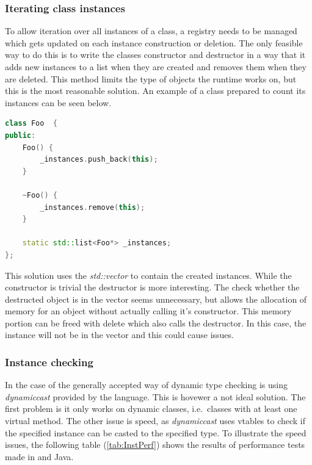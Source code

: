 \subsubsection{Iterating class instances}\label{sect:IteratingClassInstances}

To allow iteration over all instances of a class, a registry needs to be managed
which gets updated on each instance construction or deletion. The only feasible
way to do this is to write the classes constructor and destructor in a way that
it adds new instances to a list when they are created and removes them when they
are deleted. This method limits the type of objects the runtime works on, but
this is the most reasonable solution. An example of a class prepared to count
its instances can be seen below.

\begin{lstlisting}[frame=single,float=!ht,language=C++]
class Foo  {
public:
	Foo() {
		_instances.push_back(this);
	}
	
	~Foo() {
		_instances.remove(this);
	}
		
	static std::list<Foo*> _instances;
};
\end{lstlisting}

This solution uses the \emph{std::vector} to contain the created instances.
While the constructor is trivial the destructor is more interesting. The
check whether the destructed object is in the vector seems unnecessary, but \CPP{}
allows the allocation of memory for an object without actually calling it's
constructor. This memory portion can be freed with delete which also calls the
destructor. In this case, the instance will not be in the vector and this could
cause issues.

\subsubsection{Instance checking}\label{sect:InstanceChecking}

In the case of \CPP{} the generally accepted way of dynamic type checking is using
\emph{dynamic\textunderscore cast} provided by the language. This is hovewer a
not ideal solution. The first problem is it only works on dynamic classes, i.e.\
classes with at least one virtual method. The other issue is speed, as
\emph{dynamic\textunderscore cast} uses vtables to check if the specified
instance can be casted to the specified type. To illustrate the speed issues,
the following table (\ref{tab:InstPerf}) shows the results of performance tests
made in \CPP{} and Java.

